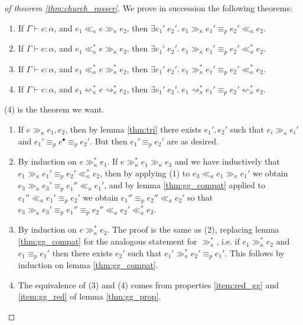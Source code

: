 \begin{proof}[of theorem \ref{thm:church_rosser}]
We prove in succession the following theorems:
\begin{enumerate}
\item If $\Gamma\vdash e:\alpha$, and $e_1\ll_\kappa e\gg_\kappa e_2$, then $\exists e_1'\;e_2'.\; e_1\gg_\kappa e_1'\equiv_p e_2'\ll_\kappa e_2$.
\item If $\Gamma\vdash e:\alpha$, and $e_1\ll_\kappa^* e\gg_\kappa e_2$, then $\exists e_1'\;e_2'.\; e_1\gg_\kappa e_1'\equiv_p e_2'\ll_\kappa^* e_2$.
\item If $\Gamma\vdash e:\alpha$, and $e_1\ll_\kappa^* e\gg_\kappa^* e_2$, then $\exists e_1'\;e_2'.\; e_1\gg_\kappa^* e_1'\equiv_p e_2'\ll_\kappa^* e_2$.
\item If $\Gamma\vdash e:\alpha$, and $e_1\leftsquigarrow_\kappa^*e\rightsquigarrow_\kappa^* e_2$, then $\exists e_1'\;e_2'.\; e_1\rightsquigarrow_\kappa^* e_1'\equiv_p e_2'\leftsquigarrow_\kappa^* e_2$.
\end{enumerate}
(4) is the theorem we want.
\begin{enumerate}
\item If $e\gg_\kappa e_1,e_2$, then by lemma \ref{thm:tri} there exists $e_1',e_2'$ such that $e_i\gg_\kappa e_i'$ and $e_1'\equiv_p e^\bullet\equiv_p e_2'$. But then $e_1'\equiv_p e_2'$ are as desired. 
\item By induction on $e\gg_\kappa^* e_1$. If $e\gg_\kappa^* e_1\gg_\kappa e_3$ and we have inductively that $e_1\gg_\kappa e_1'\equiv_p e_2'\ll_\kappa^* e_2$, then by applying (1) to $e_3\ll_\kappa e_1\gg_\kappa e_1'$ we obtain $e_3\gg_\kappa e_3'\equiv_p e_1''\ll_\kappa e_1'$, and by lemma \ref{thm:gg_compat} applied to $e_1''\ll_\kappa e_1'\equiv_p e_2'$ we obtain $e_1''\equiv_p e_2''\ll_\kappa e_2'$ so that  $e_3\gg_\kappa e_3'\equiv_p e_1''\equiv_p e_2''\ll_\kappa e_2'\ll_\kappa^* e_2$.
\item By induction on $e\gg_\kappa^* e_2$. The proof is the same as (2), replacing lemma \ref{thm:gg_compat} for the analogous statement for $\gg_\kappa^*$, i.e. if $e_1\gg_\kappa^*e_2$ and $e_1\equiv_p e_1'$ then there exists $e_2'$ such that $e_1'\gg_\kappa^*e_2'\equiv_p e_1'$. This follows by induction on lemma \ref{thm:gg_compat}.
\item  The equivalence of (3) and (4) comes from properties \ref{item:red_gg} and \ref{item:gg_red} of lemma \ref{thm:gg_prop}.
\end{enumerate}
\end{proof}

